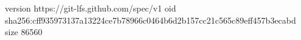 version https://git-lfs.github.com/spec/v1
oid sha256:cff935973137a13224ce7b78966c0464b6d2b157cc21c565c89eff457b3ecabd
size 86560
